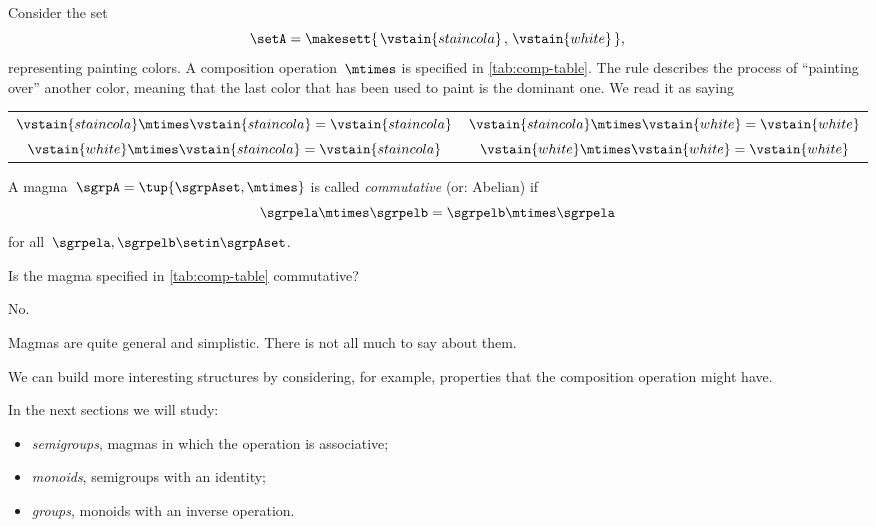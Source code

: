 \begin{example}
    Consider the set
    \begin{equation}
        \setA = \makesett{\hspace{0.05cm} \vstain{staincola}\hspace{0.05cm},\hspace{0.05cm} \vstain{white}\hspace{0.05cm}},
    \end{equation}
    representing painting colors.
    A composition operation~$\mtimes$ is specified in \cref{tab:comp-table}.
    The rule describes the process of ``painting over'' another color, meaning that the last color that has been used to paint is the dominant one.
    We read it as saying
    \begin{center}
        \setlength{\tabcolsep}{20pt}
        \begin{tabular}{cc}
            $\vstain{staincola} \mtimes \vstain{staincola} = \vstain{staincola}$ & $\vstain{staincola} \mtimes \vstain{white} = \vstain{white}$ \\
            $\vstain{white} \mtimes \vstain{staincola}     = \vstain{staincola}$ & $\vstain{white} \mtimes \vstain{white} = \vstain{white}$
        \end{tabular}
    \end{center}
\end{example}

\begin{definition}
    \label{def:magma-commutativity}
    A magma~$\sgrpA = \tup{\sgrpAset, \mtimes}$ is called \emph{commutative} (or: Abelian) if
    \begin{equation}
        \label{eq:semigroup-commutativity}
        \sgrpela \mtimes   \sgrpelb = \sgrpelb \mtimes \sgrpela
    \end{equation}
    for all~$\sgrpela , \sgrpelb \setin \sgrpAset$.
\end{definition}

\begin{exercise}
    Is the magma specified in \cref{tab:comp-table} commutative?
\end{exercise}
\begin{solution}
    No.
\end{solution}

Magmas are quite general and simplistic.
There is not all much to say about them.

We can build more interesting structures by considering, for example, properties that the composition operation might have.

In the next sections we will study:

\begin{itemize}
    \item \emph{semigroups}, magmas in which the operation is associative;
    \item \emph{monoids}, semigroups with an identity;
    \item \emph{groups}, monoids with an inverse operation.
\end{itemize}
